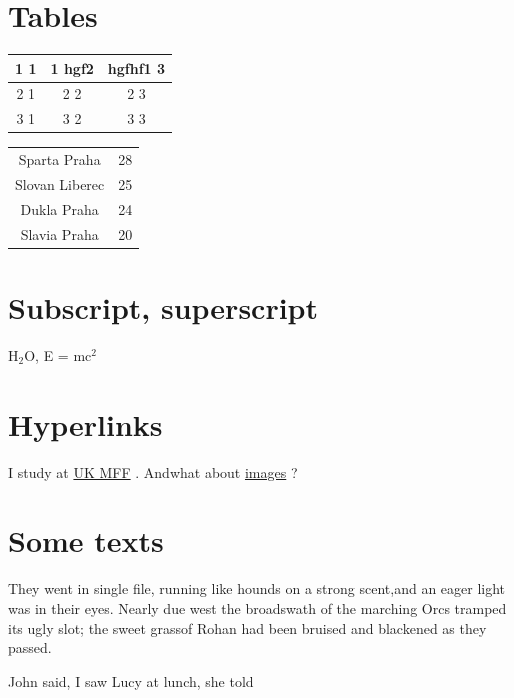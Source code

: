 \documentclass{article}
\begin{document}
 \section*{Tables} 
 \begin{table}[!ht]

 \begin{tabular}
{ |c|c|c| }
\hline   1 1 & 1 hgf2 & hgfhf1 3\\ 
\hline 2 1 & 2 2 & 2 3\\ 
\hline 3 1 & 3 2 & 3 3\\ 
\hline 
 \end{tabular}
\end{table}


 \begin{table}[!ht]

 \begin{tabular}
{ c c  }
   Sparta Praha & 28\\ 
 Slovan Liberec & 25\\ 
 Dukla Praha & 24\\ 
 Slavia Praha & 20\\ 
 
 \end{tabular}
\end{table}
 \section*{Subscript, superscript} \par H\(_{2}\)O, E = mc\(^{2}\)
 \section*{Hyperlinks} \par I study at \href{http://www.mff.cuni.cz}{UK MFF}  
. Andwhat about \href{#img}{images}  
?
 \section*{Some texts} \par \begin{center}
They went in single file, running like hounds on a strong scent,and an eager light was in their eyes. Nearly due west the broadswath of the marching \small Orcs tramped\normalsize 
its ugly slot; the sweet grassof Rohan had been bruised and blackened as they passed.\end{center}

\par John said, I saw Lucy at lunch, she told
\end{document}
